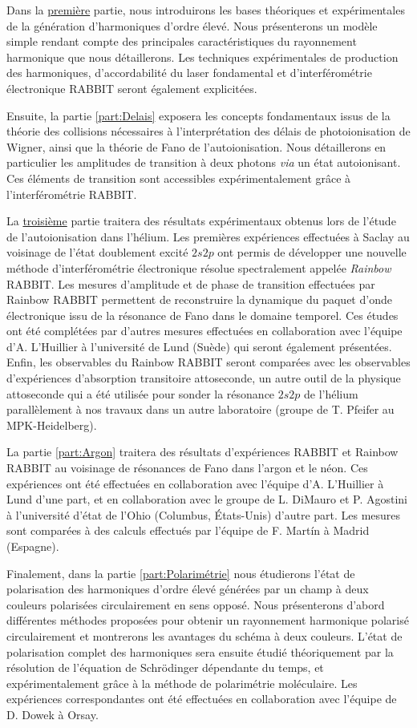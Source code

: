 Dans la \hyperref[part:GHOE]{première} partie, nous introduirons les bases théoriques et expérimentales de la génération d'harmoniques d'ordre élevé. Nous présenterons un modèle simple rendant compte des principales caractéristiques du rayonnement harmonique que nous détaillerons. Les techniques expérimentales de production des harmoniques, d'accordabilité du laser fondamental et d'interférométrie électronique RABBIT seront également explicitées.

Ensuite, la partie \ref{part:Delais} exposera les concepts fondamentaux issus de la théorie des collisions nécessaires à l'interprétation des délais de photoionisation de Wigner, ainsi que la théorie de Fano de l'autoionisation. Nous détaillerons en particulier les amplitudes de transition à deux photons \textit{via} un état autoionisant. Ces éléments de transition sont accessibles expérimentalement grâce à l'interférométrie RABBIT.

La \hyperref[part:Helium]{troisième} partie traitera des résultats expérimentaux obtenus lors de l'étude de l'autoionisation dans l'hélium. Les premières expériences effectuées à Saclay au voisinage de l'état doublement excité $2s2p$ ont permis de développer une nouvelle méthode d'interférométrie électronique résolue spectralement appelée \textit{Rainbow} RABBIT. Les mesures d'amplitude et de phase de transition effectuées par Rainbow RABBIT permettent de reconstruire la dynamique du paquet d'onde électronique issu de la résonance de Fano dans le domaine temporel. Ces études ont été complétées par d'autres mesures effectuées en collaboration avec l'équipe d'A. L'Huillier à l'université de Lund (Suède) qui seront également présentées. Enfin, les observables du Rainbow RABBIT seront comparées avec les observables d'expériences d'absorption transitoire attoseconde, un autre outil de la physique attoseconde qui a été utilisée pour sonder la résonance $2s2p$ de l'hélium parallèlement à nos travaux dans un autre laboratoire (groupe de T. Pfeifer au MPK-Heidelberg).

La partie \ref{part:Argon} traitera des résultats d'expériences RABBIT et Rainbow RABBIT au voisinage de résonances de Fano dans l'argon et le néon. Ces expériences ont été effectuées en collaboration avec l'équipe d'A. L'Huillier à Lund d'une part, et en collaboration avec le groupe de L. DiMauro et P. Agostini à l'université d'état de l'Ohio (Columbus, \'{E}tats-Unis) d'autre part. Les mesures sont comparées à des calculs effectués par l'équipe de F. Mart\'{i}n à Madrid (Espagne).

Finalement, dans la partie \ref{part:Polarimétrie} nous étudierons l'état de polarisation des harmoniques d'ordre élevé générées par un champ à deux couleurs polarisées circulairement en sens opposé. Nous présenterons d'abord différentes méthodes proposées pour obtenir un rayonnement harmonique polarisé circulairement et montrerons les avantages du schéma à deux couleurs. L'état de polarisation complet des harmoniques sera ensuite étudié théoriquement par la résolution de l'équation de Schrödinger dépendante du temps, et expérimentalement grâce à la méthode de polarimétrie moléculaire. Les expériences correspondantes ont été effectuées en collaboration avec l'équipe de D. Dowek à Orsay.


